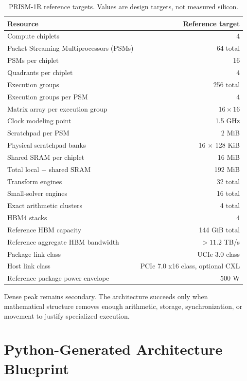 \documentclass[10pt,letterpaper]{article}
\begin{document}
\begin{table}[h]
\centering
\caption{PRISM-1R reference targets. Values are design targets, not measured silicon.}
\begin{tabularx}{0.96\linewidth}{Xr}
\toprule
\textbf{Resource} & \textbf{Reference target}\\
\midrule
Compute chiplets & 4\\
Packet Streaming Multiprocessors (PSMs) & 64 total\\
PSMs per chiplet & 16\\
Quadrants per chiplet & 4\\
Execution groups & 256 total\\
Execution groups per PSM & 4\\
Matrix array per execution group & $16\times16$\\
Clock modeling point & 1.5 GHz\\
Scratchpad per PSM & 2 MiB\\
Physical scratchpad banks & 16 $\times$ 128 KiB\\
Shared SRAM per chiplet & 16 MiB\\
Total local + shared SRAM & 192 MiB\\
Transform engines & 32 total\\
Small-solver engines & 16 total\\
Exact arithmetic clusters & 4 total\\
HBM4 stacks & 4\\
Reference HBM capacity & 144 GiB total\\
Reference aggregate HBM bandwidth & $>11.2$ TB/s\\
Package link class & UCIe 3.0 class\\
Host link class & PCIe 7.0 x16 class, optional CXL\\
Reference package power envelope & 500 W\\
\bottomrule
\end{tabularx}
\end{table}

Dense peak remains secondary. The architecture succeeds only when mathematical structure removes enough arithmetic, storage, synchronization, or movement to justify specialized execution.

\section{Python-Generated Architecture Blueprint}
\end{document}
